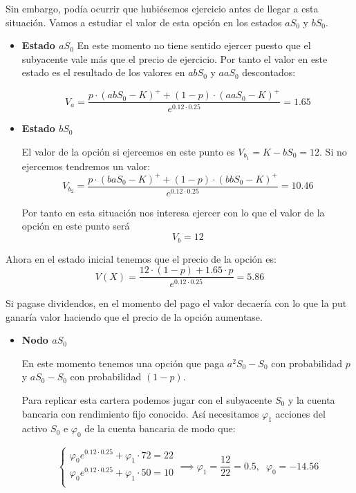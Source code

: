 \begin{problem}[2]
Sin embargo, podía ocurrir que hubiésemos ejercicio antes de llegar a esta situación. Vamos a estudiar el valor de esta opción en los estados $aS_0$ y $bS_0$.

\begin{itemize}
\item \textbf{Estado $aS_0$}
En este momento no tiene sentido ejercer puesto que el subyacente vale más que el precio de ejercicio. Por tanto el valor en este estado es el resultado de los valores en $abS_0$ y $aaS_0$ descontados:

\[V_{a} = \frac{p\cdot (abS_0-K)^+ + (1-p)\cdot (aaS_0-K)^+}{e^{0.12\cdot 0.25}}=1.65\]

\item \textbf{Estado $bS_0$}

El valor de la opción si ejercemos en este punto es $V_{b_1} = K-bS_0=12$. Si no ejercemos tendremos un valor:
\[V_{b_2} = \frac{p\cdot (baS_0-K)^+ + (1-p)\cdot (bbS_0-K)^+}{e^{0.12\cdot 0.25}} = 10.46\]

Por tanto en esta situación nos interesa ejercer con lo que el valor de la opción en este punto será
\[V_b = 12\]
\end{itemize}

Ahora en el estado inicial tenemos que el precio de la opción es:
\[V(X) = \frac{12\cdot (1-p) + 1.65\cdot p}{e^{0.12\cdot 0.25}} = 5.86\]

\spart Si pagase dividendos, en el momento del pago el valor decaería con lo que la put ganaría valor haciendo que el precio de la opción aumentase.

\spart

\begin{itemize}
\item \textbf{Nodo $aS_0$}

En este momento tenemos una opción que paga $a^2S_0-S_0$ con probabilidad $p$ y $aS_0-S_0$ con probabilidad $(1-p)$.

Para replicar esta cartera podemos jugar con el subyacente $S_0$ y la cuenta bancaria con rendimiento fijo conocido. Así necesitamos $\varphi_1$ acciones del activo $S_0$ e $\varphi_0$ de la cuenta bancaria de modo que:

\[\left\{\begin{array}{l}
\varphi_0 e^{0.12\cdot 0.25}+\varphi_1 \cdot 72 = 22 \\
\varphi_0 e^{0.12\cdot 0.25}+\varphi_1 \cdot 50 = 10 \\
\end{array}\right. \implies \varphi_1 = \frac{12}{22} = 0.5, \;\; \varphi_0 = -14.56\]


\end{itemize}
\end{problem}
